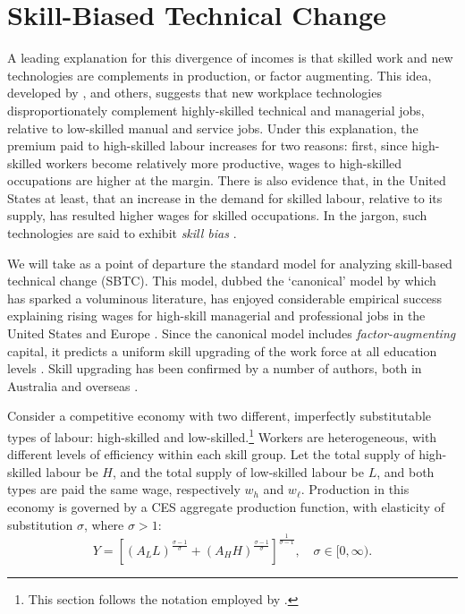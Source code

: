 \documentclass[a4paper,11pt]{article}
\begin{document}
\section{Skill-Biased Technical Change}

A leading explanation for this divergence of incomes is that skilled work and new technologies are complements in production, or factor augmenting. This idea, developed by \citet{Tinbergen1974}, \citet{Katz1992} and others, suggests that new workplace technologies disproportionately complement highly-skilled technical and managerial jobs, relative to low-skilled manual and service jobs. Under this explanation, the premium paid to high-skilled labour increases for two reasons: first, since high-skilled workers become relatively more productive, wages to high-skilled occupations are higher at the margin. There is also evidence that, in the United States at least, that an increase in the demand for skilled labour, relative to its supply, has resulted higher wages for skilled occupations. In the jargon, such technologies are said to exhibit \emph{skill bias} \citep{Autor2006}.

We will take as a point of departure the standard model for analyzing skill-based technical change (SBTC). This model, dubbed the `canonical' model by \citet{Acemoglu2011} which has sparked a voluminous literature, has enjoyed considerable empirical success explaining rising wages for high-skill managerial and professional jobs in the United States and Europe \citep{Katz1992}. Since the canonical model includes \emph{factor-augmenting} capital, it predicts a uniform skill upgrading of the work force at all education levels \citep{Levy2003}. Skill upgrading has been confirmed by a number of authors, both in Australia \citep{Esposto2012, Wooden2000, Cully1999} and overseas \citep{Autor2008}. 

Consider a competitive economy with two different, imperfectly substitutable types of labour: high-skilled and low-skilled.\footnote{This section follows the notation employed by \citet{Acemoglu2011}.} Workers are heterogeneous, with different levels of efficiency within each skill group. Let the total supply of high-skilled labour be $H$, and the total supply of low-skilled labour be $L$, and both types are paid the same wage, respectively $w_h$ and $w_\ell$. Production in this economy is governed by a CES aggregate production function, with elasticity of substitution $\sigma$, where $\sigma>1$:
\begin{equation}  \label{eq:prod}
Y = \left[
  \left(A_LL \right)^\frac{\sigma-1}{\sigma}
  +
  \left(A_HH \right)^\frac{\sigma-1}{\sigma}
  \right]^\frac{1}{\sigma-1},\quad \sigma \in [0,\infty).
\end{equation}
\end{document}
